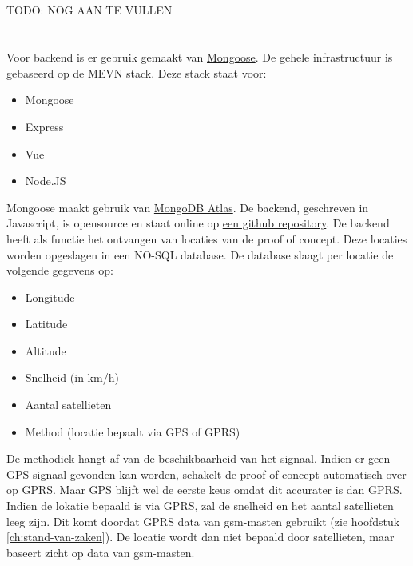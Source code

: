 \subsection{}
TODO: NOG AAN TE VULLEN
\pagebreak
\section{}
\label{ch:backend}

\subsection{}
Voor backend is er gebruik gemaakt van \href{https://mongoosejs.com/}{Mongoose}. De gehele infrastructuur is gebaseerd op de MEVN stack.
Deze stack staat voor:
\begin{itemize}
	\item Mongoose
	\item Express
	\item Vue
	\item Node.JS
\end{itemize}
Mongoose maakt gebruik van \href{https://www.mongodb.com/cloud/atlas}{MongoDB Atlas}. De backend, geschreven in Javascript, is opensource en staat online op \underline{\href{https://github.com/IndyVC/bap-backend}{een github repository}}.
\newline
De backend heeft als functie het ontvangen van locaties van de proof of concept. Deze locaties worden opgeslagen in een NO-SQL database. De database slaagt per locatie de volgende gegevens op:
\begin{itemize}
	\item Longitude
	\item Latitude
	\item Altitude
	\item Snelheid (in km/h)
	\item Aantal satellieten
	\item Method (locatie bepaalt via GPS of GPRS)
\end{itemize}
De methodiek hangt af van de beschikbaarheid van het signaal. Indien er geen GPS-signaal gevonden kan worden, schakelt de proof of concept automatisch over op GPRS. Maar GPS blijft wel de eerste keus omdat dit accurater is dan GPRS. Indien de lokatie bepaald is via GPRS, zal de snelheid en het aantal satellieten leeg zijn. Dit komt doordat GPRS data van gsm-masten gebruikt (zie hoofdstuk \ref{ch:stand-van-zaken}). De locatie wordt dan niet bepaald door satellieten, maar baseert zicht op data van gsm-masten. 


